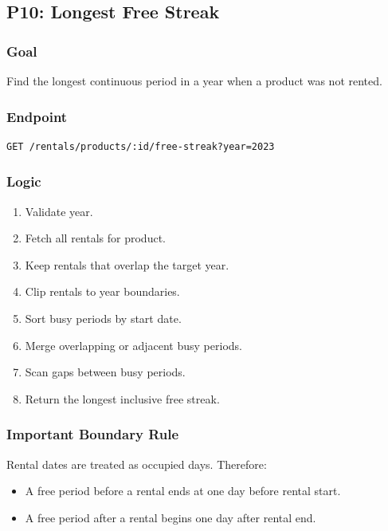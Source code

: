 \documentclass[11pt,a4paper]{article}
\begin{document}
\subsection{P10: Longest Free Streak}

\subsubsection*{Goal}
Find the longest continuous period in a year when a product was not rented.

\subsubsection*{Endpoint}

\begin{lstlisting}
GET /rentals/products/:id/free-streak?year=2023
\end{lstlisting}

\subsubsection*{Logic}

\begin{enumerate}
  \item Validate year.
  \item Fetch all rentals for product.
  \item Keep rentals that overlap the target year.
  \item Clip rentals to year boundaries.
  \item Sort busy periods by start date.
  \item Merge overlapping or adjacent busy periods.
  \item Scan gaps between busy periods.
  \item Return the longest inclusive free streak.
\end{enumerate}

\subsubsection*{Important Boundary Rule}

Rental dates are treated as occupied days. Therefore:

\begin{itemize}
  \item A free period before a rental ends at one day before rental start.
  \item A free period after a rental begins one day after rental end.
\end{itemize}
\end{document}
